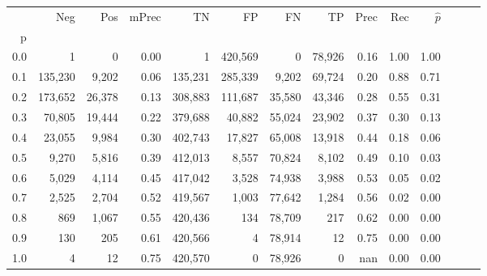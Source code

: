 \begin{tabular}{rrrrrrrrrrrrrr}
\toprule
{} &      Neg &     Pos & mPrec &       TN &       FP &      FN &      TP &  Prec &   Rec & $\hat{p}$ \\
p   &          &         &       &          &          &         &         &       &       &           \\
\midrule
0.0 &        1 &       0 &  0.00 &        1 &  420,569 &       0 &  78,926 &  0.16 &  1.00 &      1.00 \\
0.1 &  135,230 &   9,202 &  0.06 &  135,231 &  285,339 &   9,202 &  69,724 &  0.20 &  0.88 &      0.71 \\
0.2 &  173,652 &  26,378 &  0.13 &  308,883 &  111,687 &  35,580 &  43,346 &  0.28 &  0.55 &      0.31 \\
0.3 &   70,805 &  19,444 &  0.22 &  379,688 &   40,882 &  55,024 &  23,902 &  0.37 &  0.30 &      0.13 \\
0.4 &   23,055 &   9,984 &  0.30 &  402,743 &   17,827 &  65,008 &  13,918 &  0.44 &  0.18 &      0.06 \\
0.5 &    9,270 &   5,816 &  0.39 &  412,013 &    8,557 &  70,824 &   8,102 &  0.49 &  0.10 &      0.03 \\
0.6 &    5,029 &   4,114 &  0.45 &  417,042 &    3,528 &  74,938 &   3,988 &  0.53 &  0.05 &      0.02 \\
0.7 &    2,525 &   2,704 &  0.52 &  419,567 &    1,003 &  77,642 &   1,284 &  0.56 &  0.02 &      0.00 \\
0.8 &      869 &   1,067 &  0.55 &  420,436 &      134 &  78,709 &     217 &  0.62 &  0.00 &      0.00 \\
0.9 &      130 &     205 &  0.61 &  420,566 &        4 &  78,914 &      12 &  0.75 &  0.00 &      0.00 \\
1.0 &        4 &      12 &  0.75 &  420,570 &        0 &  78,926 &       0 &   nan &  0.00 &      0.00 \\
\bottomrule
\end{tabular}
